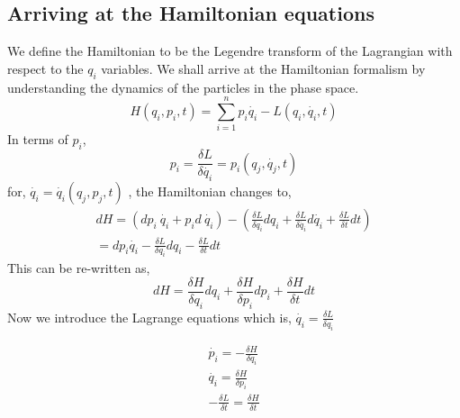 		\subsection{Arriving at the Hamiltonian equations}
		We define the Hamiltonian to be the Legendre transform of the Lagrangian with respect to the $q_{i}$ variables. We shall arrive at the Hamiltonian formalism by understanding the dynamics of the particles in the phase space. 
		\begin{equation}
		    H(q_{i}, p_{i}, t) = \sum_{i=1}^{n} p_{i} \dot{q_{i}} - L(q_{i}, \dot{q_{i}}, t)
		\end{equation}
		In terms of $p_{i}$, 
		\begin{equation}
		    p_{i} = \frac{\delta L}{\delta \dot{q_{i}}} = p_{i}(q_{j},\dot{q_{j}}, t)
		\end{equation}
		for, $\dot{q_{i}} = \dot{q_{i}}(q_{j}, p_{j},t )$ , the Hamiltonian changes to, 
	\begin{gather}
	     dH = (dp_{i} \: \dot{q_{i}}+ p_{i}d \: \dot{q_{i}}) - (\frac{\delta L}{\delta q_{i}} d q_{i} +  \frac{\delta L}{\delta \dot{q_{i}}} d\dot{ q_{i}} + \frac{\delta L}{\delta t} dt) \\ 
		    = d p_{i} \dot{q_{i}} - \frac{\delta L}{\delta q_{i}} dq_{i} - \frac{\delta L}{\delta t} dt 
	\end{gather}
	This can be re-written as, 
	\begin{equation}
	    	dH = \frac{\delta H}{\delta q_{i}} d q_{i} +  \frac{\delta H}{\delta {p_{i}}} d { p_{i}} + \frac{\delta H}{\delta t} dt
	\end{equation}
	Now we introduce the Lagrange equations which is, $\dot{q_{i}} = \frac{\delta L}{\delta q_{i}}$
\begin{tcolorbox}
    

	\begin{gather}
	    \dot{p_{i}} = - \frac{\delta H}{\delta q_{i}} \\
	    \dot{q_{i}} = \frac{\delta H}{\delta p_{i}} \\
	    - \frac{\delta L}{\delta t} = \frac{\delta H}{\delta t}
	\end{gather}
	\end{tcolorbox}
